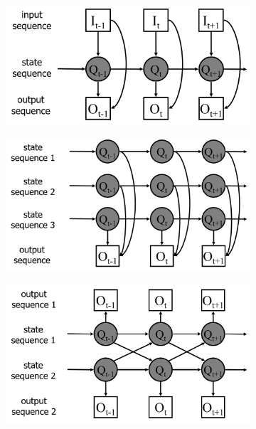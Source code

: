 \documentclass[a4paper,oneside,titlepage]{book}
\begin{document}
\begin{figure}[htp]
	\begin{subfigure}{0.3\textwidth}
        \centering
        \includegraphics[width=\textwidth, height=\textheight, keepaspectratio]{io-hmm.png}
        \caption{}
    \end{subfigure}
    \hfill
    \begin{subfigure}{0.3\textwidth}
        \centering
        \includegraphics[width=\textwidth, height=\textheight, keepaspectratio]{fact-hmm.png}
        \caption{}
    \end{subfigure}
    \hfill
    \begin{subfigure}{0.3\textwidth}
        \centering
        \includegraphics[width=\textwidth, height=\textheight, keepaspectratio]{coupled-hmm.png}
        \caption{}
    \end{subfigure}
\end{figure}
\end{document}

